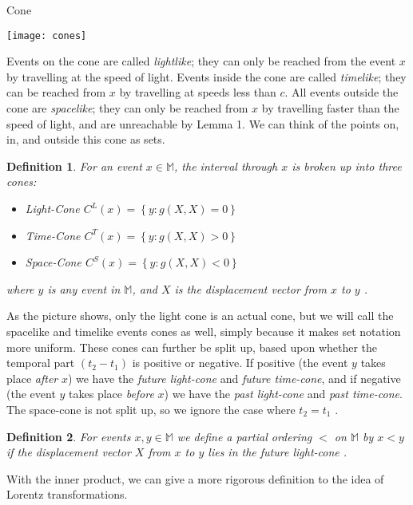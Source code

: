 \documentclass[12pt]{article}
\theoremstyle{defn}
\newtheorem{defn}{Definition}
\theoremstyle{pf}
\newcommand{\M}{\mathbb{M}}
\newcommand{\0}{\emptyset}
\renewcommand{\-}{\setminus}
\begin{document}
{\small
\begin{center}Cone\end{center}}
\begin{center}\texttt{[image: cones]}\end{center}

Events on the cone are called \textit{lightlike}; they can only be reached from the event $x$ by travelling at the speed of light. Events inside the cone are called \textit{timelike}; they can be reached from $x$ by travelling at speeds less than $c$. All events outside the cone are \textit{spacelike}; they can only be reached from $x$ by travelling faster than the speed of light, and are unreachable by Lemma 1. We can think of the points on, in, and outside this cone as sets.

\begin{defn}
For an event $x\in \M$, the interval through $x$ is broken up into three cones:
\begin{itemize}
 \item \textit{Light-Cone} $C^L(x)=\left\{y:g(X,X)=0\right\}$
\item \textit{Time-Cone} $C^T(x)=\left\{y:g(X,X)>0\right\}$
\item \textit{Space-Cone} $C^S(x)=\left\{y:g(X,X)<0\right\}$
\end{itemize}
where $y$ is any event in $\M$, and $X$ is the displacement vector from $x$ to $y$ \cite{zeeman}.
\end{defn}

As the picture shows, only the light cone is an actual cone, but we will call the spacelike and timelike events cones as well, simply because it makes set notation more uniform. These cones can further be split up, based upon whether the temporal part $(t_2-t_1)$ is positive or negative. If positive (the event $y$ takes place \textit{after} $x$) we have the \textit{future light-cone} and \textit{future time-cone}, and if negative (the event $y$ takes place \textit{before} $x$) we have the \textit{past light-cone} and \textit{past time-cone}. The space-cone is not split up, so we ignore the case where $t_2=t_1$ \cite{callahan}. 

\begin{defn}
For events $x,y\in\M$ we define a partial ordering $<$ on $\M$ by $x<y$ if the displacement vector $X$ from $x$ to $y$ lies in the future light-cone \cite{zeeman}.\end{defn}

With the inner product, we can give a more rigorous definition to the idea of Lorentz transformations.
\end{document}
